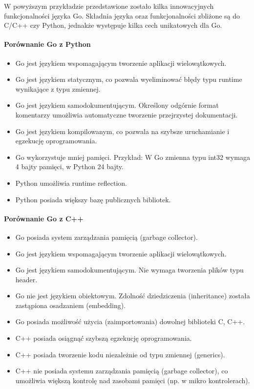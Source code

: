 \documentclass[a4paper,12pt,twoside,openany]{report}
\begin{document}

W powyższym przykładzie przedstawione zostało kilka innowacyjnych funkcjonalności języka Go.
Składnia języka oraz funkcjonalności zbliżone są do C/C++ czy Python, jednakże występuje kilka cech unikatowych dla Go.

\paragraph{Porównanie Go z Python}
\begin{itemize}
 \item Go jest językiem wspomagającym tworzenie aplikacji wielowątkowych.
 \item Go jest językiem statycznym, co pozwala wyeliminować błędy typu runtime wynikające z typu zmiennej.
 \item Go jest językiem samodokumentującym. Określony odgórnie format komentarzy umożliwia automatyczne tworzenie przejrzystej dokumentacji.
 \item Go jest językiem kompilowanym, co pozwala na szybsze uruchamianie i egzekucję oprogramowania.
 \item Go wykorzystuje mniej pamięci. Przykład: W Go zmienna typu int32 wymaga 4 bajty pamięci, w Python 24 bajty.
 \item Python umożliwia runtime reflection.
 \item Python posiada większy bazę publicznych bibliotek.
\end{itemize}

\paragraph{Porównanie Go z C++}
\begin{itemize}
 \item Go posiada system zarządzania pamięcią (garbage collector).
 \item Go jest językiem wspomagającym tworzenie aplikacji wielowątkowych.
 \item Go jest językiem samodokumentującym. Nie wymaga tworzenia plików typu header.
 \item Go nie jest językiem obiektowym. Zdolność dziedziczenia (inheritance) została zastąpiona osadzaniem (embedding).
 \item Go posiada możliwość użycia (zaimportowania) dowolnej biblioteki C, C++.
 \item C++ posiada osiągnąć szybszą egzekucję oprogramowania.
 \item C++ posiada tworzenie kodu niezależnie od typu zmiennej (generics).
 \item C++ nie posiada systemu zarządzania pamięcią (garbage collector), co umożliwia większą kontrolę nad zasobami pamięci (np. w mikro kontrolerach).
\end{itemize}
\end{document}
